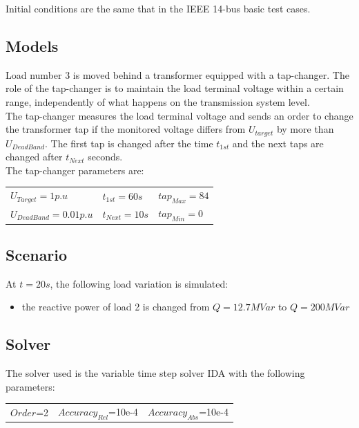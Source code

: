 \documentclass[a4paper, 12pt]{report}
\begin{document}
Initial conditions are the same that in the IEEE 14-bus basic test cases.

\subsection{Models}

Load number 3 is moved behind a transformer equipped with a tap-changer. The role of the tap-changer is to maintain the load terminal voltage within a certain range, independently of what happens on the transmission system level. \\

The tap-changer measures the load terminal voltage and sends an order to change the transformer tap if the monitored voltage differs from $U_{target}$ by more than $U_{DeadBand}$. The first tap is changed after the time $t_{1st}$ and the next taps are changed after $t_{Next}$ seconds.\\

The tap-changer parameters are:
\begin{center}
\begin{tabular}{l|l|l}
   $U_{Target}=1p.u$ & $t_{1st}=60s$ & $tap_{Max}=84$ \\
   $U_{DeadBand}=0.01p.u$  & $t_{Next}=10s$ & $tap_{Min}=0$ \\
\end{tabular}
\end{center}

\subsection{Scenario}
At $t=20s$, the following load variation is simulated:
\begin{itemize}
\item{the reactive power of load 2 is changed from $Q=12.7MVar$ to $Q=200MVar$}
\end{itemize}

\subsection{Solver}
The solver used is the variable time step solver IDA with the following parameters:
\begin{center}
\begin{tabular}{l|l|l}
   $Order$=2 & $Accuracy_{Rel}$=10e-4 & $Accuracy_{Abs}$=10e-4 \\
\end{tabular}
\end{center}
\end{document}
